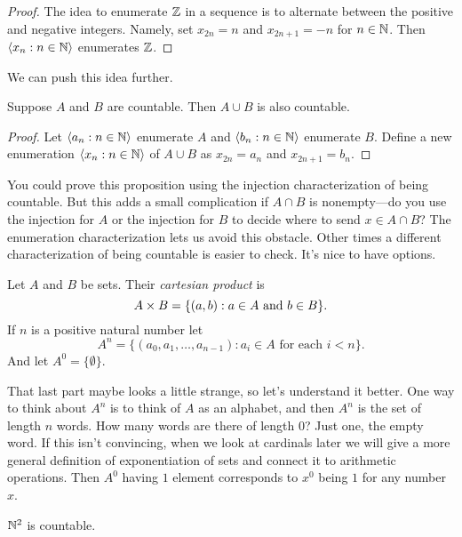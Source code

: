 \documentclass[10pt]{amsart}
\begin{document}
\begin{proof}
The idea to enumerate $\mathbb{Z}$ in a sequence is to alternate between the positive and negative integers. Namely, set $x_{2n} = n$ and $x_{2n+1} = -n$ for $n \in \mathbb{N}$. Then ${\left\langle x_n : n \in \mathbb{N} \right\rangle}$ enumerates $\mathbb{Z}$.
\end{proof}

We can push this idea further.

\begin{proposition}
Suppose $A$ and $B$ are countable. Then $A \cup B$ is also countable. 
\end{proposition}

\begin{proof}
Let ${\left\langle a_n : n \in \mathbb{N} \right\rangle}$ enumerate $A$ and ${\left\langle b_n : n \in \mathbb{N} \right\rangle}$ enumerate $B$. Define a new enumeration ${\left\langle x_n : n \in \mathbb{N} \right\rangle}$ of $A \cup B$ as $x_{2n} = a_n$ and $x_{2n+1} = b_n$. 
\end{proof}

You could prove this proposition using the injection characterization of being countable. But this adds a small complication if $A \cap B$ is nonempty---do you use the injection for $A$ or the injection for $B$ to decide where to send $x \in A \cap B$? The enumeration characterization lets us avoid this obstacle. Other times a different characterization of being countable is easier to check. It's nice to have options.

\begin{definition}
Let $A$ and $B$ be sets. Their \emph{cartesian product} is 
\[
A \times B = \{ (a,b) : a \in A \textrm{ and } b \in B\}.
\]
If $n$ is a positive natural number let 
\[
A^n = \{ (a_0, a_1, \ldots, a_{n-1}) : a_i \in A \text{ for each } i < n\}.
\]
And let $A^0 = \{ \emptyset \}$.
\end{definition}

That last part maybe looks a little strange, so let's understand it better. One way to think about $A^n$ is to think of $A$ as an alphabet, and then $A^n$ is the set of length $n$ words. How many words are there of length $0$? Just one, the empty word. 
If this isn't convincing, when we look at cardinals later we will give a more general definition of exponentiation of sets and connect it to arithmetic operations. Then $A^0$ having $1$ element corresponds to $x^0$ being $1$ for any number $x$.

\begin{proposition}
$\mathbb{N}^2$ is countable.
\end{proposition}
\end{document}
